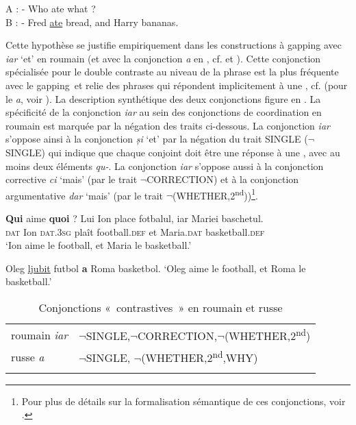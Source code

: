 \ea \label{ch2:ex177}
A : - Who ate what ?\\
B : - Fred \uline{ate} bread, and Harry bananas.
\z

\largerpage[-1]
Cette hypothèse se justifie empiriquement dans les constructions à gapping avec \textit{iar} ‘et’ en roumain  (et avec la conjonction \textit{a} en  , cf. \citealt{Kazenin2001} et \citealt{JasinskajaEtAl2009}). Cette conjonction spécialisée pour le double contraste au niveau de la phrase est la plus fréquente avec le gapping~et relie des phrases qui répondent implicitement à une , cf. \citet{BilbiieEtAl2011} (pour le  \textit{a}, voir \citealt{JasinskajaEtAl2010}). La description synthétique des deux conjonctions figure en . La spécificité de la conjonction \textit{iar} au sein des conjonctions de coordination en roumain est marquée par la négation des traits ci-dessous. La conjonction \textit{iar} s’oppose ainsi à la conjonction \textit{și} ‘et’ par la négation du trait SINGLE (${\lnot}$SINGLE) qui indique que chaque conjoint doit être une réponse à une , avec au moins deux éléments \textit{qu-}. La conjonction \textit{iar} s’oppose aussi à la conjonction corrective \textit{ci} ‘mais’ (par le trait ${\lnot}$CORRECTION) et à la conjonction argumentative \textit{dar} ‘mais’ (par le trait ${\lnot}$(WHETHER,2\textsuperscript{nd}))\footnote{
 Pour plus de détails sur la formalisation sémantique de ces conjonctions, voir \citet{BilbiieEtAl2011}.}. 

\ea \textbf{Qui} aime \textbf{quoi} ? 
\ea  
\gll Lui  Ion    place  fotbalul,  iar  Mariei  baschetul. \label{ch2:ex178b}\\
\textsc{dat}  Ion \textsc{dat.3sg}  plaît  football.\textsc{def}  et  Maria.\textsc{dat}  basketball.\textsc{def}\\
\glt ‘Ion aime le football, et Maria le basketball.’

\ex Oleg \uline{ljubit} futbol \textbf{a} Roma basketbol. \label{ch2:ex178c} 
\glt ‘Oleg aime le football, et Roma le basketball.’ 
\z
\z


\begin{table}
\caption{Conjonctions «~contrastives~» en roumain et russe}
\label{ch2:tab1}

\begin{tabularx}{.8\textwidth}{lX}
\lsptoprule
roumain \textit{iar} & ${\lnot}$SINGLE,${\lnot}$CORRECTION,${\lnot}$(WHETHER,2\textsuperscript{nd})\\
russe \textit{a} & ${\lnot}$SINGLE, ${\lnot}$(WHETHER,2\textsuperscript{nd},WHY)\\
\lspbottomrule
\end{tabularx}

\end{table} 


